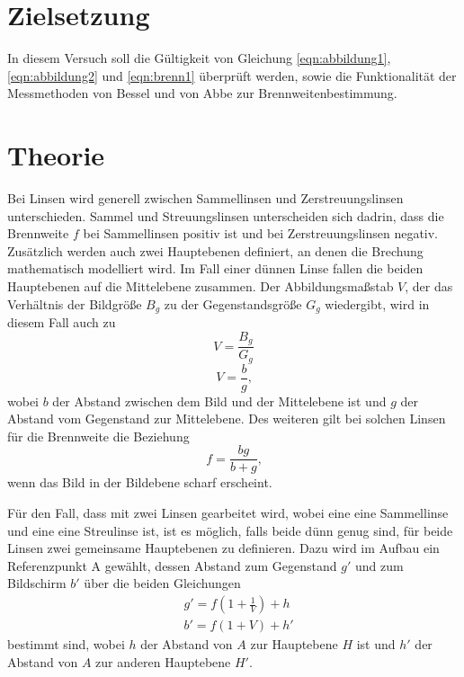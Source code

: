 \section{Zielsetzung}
In diesem Versuch soll die Gültigkeit von Gleichung \ref{eqn:abbildung1}, \ref{eqn:abbildung2} und \ref{eqn:brenn1} überprüft werden, sowie die Funktionalität der Messmethoden von Bessel und von Abbe zur Brennweitenbestimmung.


\section{Theorie \cite{V408}}
\label{sec:Theorie}
    \noindent Bei Linsen wird generell zwischen Sammellinsen und Zerstreuungslinsen unterschieden. Sammel und Streuungslinsen unterscheiden sich dadrin, dass die Brennweite $f$ bei Sammellinsen positiv ist und bei Zerstreuungslinsen negativ.
    Zusätzlich werden auch zwei Hauptebenen definiert, an denen die Brechung mathematisch modelliert wird. Im Fall einer dünnen Linse fallen die beiden Hauptebenen auf die Mittelebene zusammen. Der Abbildungsmaßstab $V$, der das Verhältnis der Bildgröße $B_g$
    zu der Gegenstandsgröße $G_g$ wiedergibt, wird in diesem Fall auch zu
    \begin{equation}
        V=\frac{B_g}{G_g} 
        \label{eqn:abbildung1}
    \end{equation}
    \begin{equation}
        V=\frac{b}{g} \text{,}
        \label{eqn:abbildung2}
    \end{equation}
    \noindent wobei $b$ der Abstand zwischen dem Bild und der Mittelebene ist und $g$ der Abstand vom Gegenstand zur Mittelebene.
    Des weiteren gilt bei solchen Linsen für die Brennweite die Beziehung
    \begin{equation}
        f=\frac{bg}{b+g} \text{,}
        \label{eqn:brenn1}
    \end{equation}
    \noindent wenn das Bild in der Bildebene scharf erscheint.

    \noindent Für den Fall, dass mit zwei Linsen gearbeitet wird, wobei eine eine Sammellinse und eine eine Streulinse ist, ist es möglich, falls beide dünn genug sind, für beide Linsen zwei gemeinsame Hauptebenen zu definieren.
    Dazu wird im Aufbau ein Referenzpunkt A gewählt, dessen Abstand zum Gegenstand $g'$ und zum Bildschirm $b'$ über die beiden Gleichungen
    \begin{align}
       & g'=f(1+\frac{1}{V})+h \\
        & b'=f(1+V)+h'
        \label{eqn:abbe}
    \end{align}
    bestimmt sind, wobei $h$ der Abstand von $A$ zur Hauptebene $H$ ist und $h'$ der Abstand von $A$ zur anderen Hauptebene $H'$.

